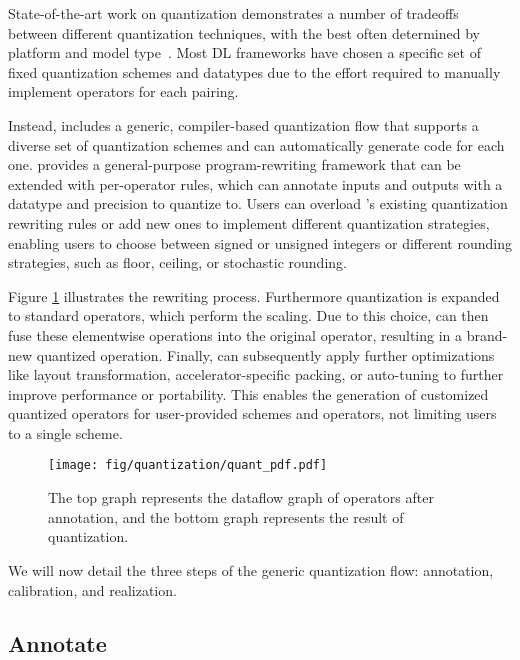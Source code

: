State-of-the-art work on quantization demonstrates a number of tradeoffs
  between different quantization techniques,
  with the best often determined by platform and model type~\cite{krishnamoorthi18}.
Most DL frameworks have chosen a specific set of fixed quantization
  schemes and datatypes due to the effort required to manually implement operators for
  each pairing.

Instead, \relay includes a generic, compiler-based quantization flow that supports a diverse set
  of quantization schemes and can automatically generate code for each one.
\relay provides a general-purpose program-rewriting framework that can be extended
  with per-operator rules, which can annotate inputs and outputs with a datatype
  and precision to quantize to.
Users can overload \relay's existing quantization rewriting rules or add new ones
  to implement different quantization strategies, enabling users to choose between
  signed or unsigned integers or different rounding strategies, such as
  floor, ceiling, or stochastic rounding.

Figure \ref{fig:quant_flow} illustrates the rewriting process.
Furthermore quantization is expanded to standard
  \relay operators, which perform the scaling.
Due to this choice, \relay can then fuse these elementwise operations
  into the original operator, resulting in a brand-new quantized operation.
Finally, \relay can subsequently apply further optimizations like
  layout transformation, accelerator-specific packing, or
  auto-tuning to further improve performance or portability.
This enables the generation of customized quantized operators
  for user-provided schemes and operators,
  not limiting users to a single scheme.

\begin{figure}[h]
  \texttt{[image: fig/quantization/quant\_pdf.pdf]}
  \caption{\textmd{The top graph represents the dataflow graph of operators after annotation,
  and the bottom graph represents the result of quantization.}}
  \label{fig:quant_flow}
\end{figure}

We will now detail the three steps of the generic quantization flow:
  annotation, calibration, and realization.

\subsection*{Annotate}


